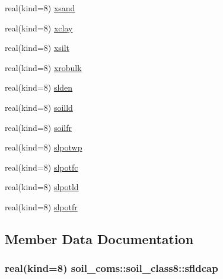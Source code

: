 \begin{DoxyCompactItemize}
real(kind=8) \hyperlink{structsoil__coms_1_1soil__class8_a24675f7b8a4831107b789f2a0baf1ce0}{xsand}
\item 
real(kind=8) \hyperlink{structsoil__coms_1_1soil__class8_a1467dcc1db48946691d15286796eb6e7}{xclay}
\item 
real(kind=8) \hyperlink{structsoil__coms_1_1soil__class8_a1f3b706650a31e7a27f5d42c21c97bfd}{xsilt}
\item 
real(kind=8) \hyperlink{structsoil__coms_1_1soil__class8_a6a2e1db6e017a97a55dc174564431d97}{xrobulk}
\item 
real(kind=8) \hyperlink{structsoil__coms_1_1soil__class8_abae7707cf7d7fc686bcad68704550fe3}{slden}
\item 
real(kind=8) \hyperlink{structsoil__coms_1_1soil__class8_a0c1fb28fa7e98d14b115d58a6b88ab9b}{soilld}
\item 
real(kind=8) \hyperlink{structsoil__coms_1_1soil__class8_aa21cc49ddb21daca2a8410f981befa07}{soilfr}
\item 
real(kind=8) \hyperlink{structsoil__coms_1_1soil__class8_a493e4af60b1b40c9420440fbefd342b3}{slpotwp}
\item 
real(kind=8) \hyperlink{structsoil__coms_1_1soil__class8_aafc4c96e7fd4620fc97e77213d40051a}{slpotfc}
\item 
real(kind=8) \hyperlink{structsoil__coms_1_1soil__class8_a405447c7ad1cee6f9fb30c1169d65c11}{slpotld}
\item 
real(kind=8) \hyperlink{structsoil__coms_1_1soil__class8_aebd17d532bcc9b55de3b5c4eba7e2e8f}{slpotfr}
\end{DoxyCompactItemize}


\subsection{Member Data Documentation}
\subsubsection[{\texorpdfstring{sfldcap}{sfldcap}}]{\setlength{\rightskip}{0pt plus 5cm}real(kind=8) soil\+\_\+coms\+::soil\+\_\+class8\+::sfldcap}\hypertarget{structsoil__coms_1_1soil__class8_a547e100b3580e0636f85111c5eefc993}{}\label{structsoil__coms_1_1soil__class8_a547e100b3580e0636f85111c5eefc993}
